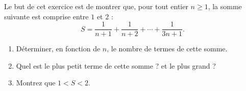 Le but de cet exercice est de montrer que, pour tout entier $n \geq 1$, la
somme suivante est comprise entre $1$ et $2$ :
\[
S = \frac{1}{n+1} + \frac{1}{n+2} + \cdots + \frac{1}{3n+1}.
\]
\begin{enumerate}
  \item Déterminer, en fonction de $n$, le nombre de termes de cette somme.
  \item Quel est le plus petit terme de cette somme ? et le plus grand ?
  \item Montrez que $1 < S < 2$.
\end{enumerate}
